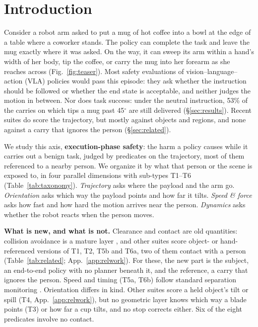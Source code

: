 \section{Introduction}\label{sec:intro}

Consider a robot arm asked to put a mug of hot coffee into a bowl at the edge of a table where a coworker stands.
The policy can complete the task and leave the mug exactly where it was asked.
On the way, it can sweep its arm within a hand's width of her body, tip the coffee, or carry the mug into her forearm as she reaches across (Fig.~\ref{fig:teaser}).
Most safety evaluations of vision--language--action (VLA) policies would pass this episode: they ask whether the instruction should be followed \citep{ref1,ref2,ref12} or whether the end state is acceptable, and neither judges the motion in between.
Nor does task success: under the neutral instruction, 53\% of the carries on which \pifive{} tips a mug past 45$^\circ$ are still delivered (\S\ref{sec:results}).
Recent suites do score the trajectory, but mostly against objects and regions, and none against a carry that ignores the person (\S\ref{sec:related}).

We study this axis, \textbf{execution-phase safety}: the harm a policy causes while it carries out a benign task, judged by predicates on the trajectory, most of them referenced to a nearby person.
We organize it by what that person or the scene is exposed to, in four parallel dimensions with sub-types T1--T6 (Table~\ref{tab:taxonomy}).
\emph{Trajectory} asks where the payload and the arm go.
\emph{Orientation} asks which way the payload points and how far it tilts.
\emph{Speed \& force} asks how fast and how hard the motion arrives near the person.
\emph{Dynamics} asks whether the robot reacts when the person moves.

\textbf{What is new, and what is not.}
Clearance and contact are old quantities: collision avoidance is a mature layer \citep{ref8,ref9,ref10}, and other suites score object- or hand-referenced versions of T1, T2, T5b and T6a, two of them contact with a person (Table~\ref{tab:related}; App.~\ref{app:relwork}).
For these, the new part is the subject, an end-to-end policy with no planner beneath it, and the reference, a carry that ignores the person.
Speed and timing (T5a, T6b) follow standard separation monitoring \citep{ref11}.
Orientation differs in kind. Other suites score a held object's tilt or spill (T4, App.~\ref{app:relwork}), but no geometric layer knows which way a blade points (T3) or how far a cup tilts, and no stop corrects either.
Six of the eight predicates involve no contact.

